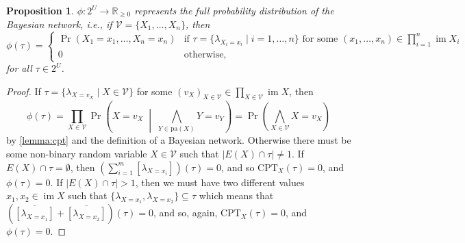 \documentclass{article}
\newtheorem{proposition}{Proposition}
\theoremstyle{definition}
\theoremstyle{remark}
\DeclareMathOperator{\im}{im}
\begin{document}
\begin{proposition} \label{lemma:full_distribution}
  $\phi\colon 2^U \to \mathbb{R}_{\ge 0}$ represents the full probability
  distribution of the Bayesian network, i.e., if $\mathcal{V} = \{ X_1, \dots,
  X_n\}$, then
  \[
    \phi(\tau) =
    \begin{cases}
      \Pr(X_1 = x_1, \dots, X_n = x_n) & \text{if } \tau = \{ \lambda_{X_i=x_i}
      \mid i = 1, \dots, n \} \text{ for some } (x_1, \dots, x_n) \in
      \prod_{i=1}^n \im X_i \\
      0 & \text{otherwise,}
    \end{cases}
  \]
  for all $\tau \in 2^U$.
\end{proposition}
\begin{proof}
  If $\tau = \{ \lambda_{X=v_X} \mid X \in \mathcal{V} \}$ for some $(v_X)_{X
    \in \mathcal{V}} \in \prod_{X \in \mathcal{V}} \im X$, then
  \[
    \phi(\tau) = \prod_{X \in \mathcal{V}} \Pr \left( X=v_X \;\middle|\;
      \bigwedge_{Y \in \mathrm{pa}(X)} Y=v_Y \right) = \Pr \left( \bigwedge_{X
        \in \mathcal{V}} X=v_X \right)
  \]
  by \cref{lemma:cpt} and the definition of a Bayesian network. Otherwise there
  must be some non-binary random variable $X \in \mathcal{V}$ such that $|E(X)
  \cap \tau| \ne 1$. If $E(X) \cap \tau = \emptyset$, then $\left( \sum_{i=1}^m
    [\lambda_{X = x_i}] \right)(\tau) = 0$, and so $\mathrm{CPT}_X(\tau) = 0$,
  and $\phi(\tau) = 0$. If $|E(X) \cap \tau| > 1$, then we must have two
  different values $x_1, x_2 \in \im X$ such that $\{\lambda_{X=x_1},
  \lambda_{X=x_2} \} \subseteq \tau$ which means that
  $(\overline{[\lambda_{X=x_1}]} + \overline{[\lambda_{X=x_2}]})(\tau) = 0$, and
  so, again, $\mathrm{CPT}_X(\tau) = 0$, and $\phi(\tau) = 0$.
\end{proof}
\end{document}
